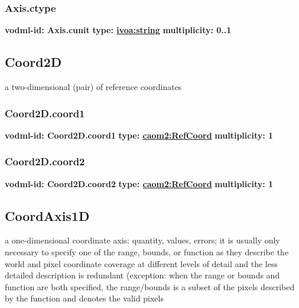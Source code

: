     \subsubsection{Axis.ctype}
      \textbf{vodml-id: Axis.cunit} \newline
      \textbf{type: \hyperref[sect:ivoa]{ivoa:string}} \newline
      \textbf{multiplicity: 0..1} 

  \subsection{Coord2D}
  \label{sect:Coord2D}
    a two-dimensional (pair) of reference coordinates

    \subsubsection{Coord2D.coord1}
      \textbf{vodml-id: Coord2D.coord1} \newline
      \textbf{type: \hyperref[sect:RefCoord]{caom2:RefCoord}} \newline
      \textbf{multiplicity: 1} 

    \subsubsection{Coord2D.coord2}
      \textbf{vodml-id: Coord2D.coord2} \newline
      \textbf{type: \hyperref[sect:RefCoord]{caom2:RefCoord}} \newline
      \textbf{multiplicity: 1} 

  \subsection{CoordAxis1D}
  \label{sect:CoordAxis1D}
    a one-dimensional coordinate axis: quantity, values, errors; it is usually only necessary to specify one of the range, bounds, or function as they describe the world and pixel coordinate coverage at different levels of detail and the less detailed description is redundant (exception: when the range or bounds and function are both specified, the range/bounds is a subset of the pixels described by the function and denotes the valid pixels

